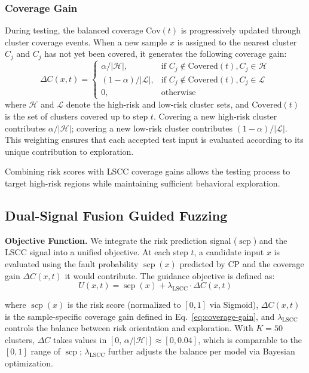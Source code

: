 \documentclass[preprint,number,5p,twocolumn]{elsarticle}
\DeclareMathOperator{\scp}{scp}
\begin{document}
\subsubsection{Coverage Gain}

During testing, the balanced coverage $\mathrm{Cov}(t)$ is progressively updated through cluster coverage events. When a new sample $x$ is assigned to the nearest cluster $C_j$ and $C_j$ has not yet been covered, it generates the following coverage gain:
\begin{equation}\label{eq:coverage-gain}
  \Delta C(x, t) =
  \begin{cases}
    \alpha / |\mathcal{H}|,       & \text{if } C_j \notin \mathrm{Covered}(t), C_j \in \mathcal{H} \\
    (1 - \alpha) / |\mathcal{L}|, & \text{if } C_j \notin \mathrm{Covered}(t), C_j \in \mathcal{L} \\
    0,                              & \text{otherwise}
  \end{cases}
\end{equation}
where $\mathcal{H}$ and $\mathcal{L}$ denote the high-risk and low-risk cluster sets, and $\mathrm{Covered}(t)$ is the set of clusters covered up to step $t$. Covering a new high-risk cluster contributes $\alpha / |\mathcal{H}|$; covering a new low-risk cluster contributes $(1 - \alpha) / |\mathcal{L}|$. This weighting ensures that each accepted test input is evaluated according to its unique contribution to exploration.

Combining risk scores with LSCC coverage gains allows the testing process to target high-risk regions while maintaining sufficient behavioral exploration.

\subsection{Dual-Signal Fusion Guided Fuzzing}\label{sec:fuzzing}

\textbf{Objective Function.} We integrate the risk prediction signal ($\scp$) and the LSCC signal into a unified objective. At each step $t$, a candidate input $x$ is evaluated using the fault probability $\scp(x)$ predicted by CP and the coverage gain $\Delta C(x, t)$ it would contribute. The guidance objective is defined as:
\begin{equation}\label{eq:objective}
  U(x, t) = \scp(x) + \lambda_{\mathrm{LSCC}} \cdot \Delta C(x, t)
\end{equation}

where $\scp(x)$ is the risk score (normalized to $[0,1]$ via Sigmoid),
$\Delta C(x, t)$ is the sample-specific coverage gain defined in Eq.~\ref{eq:coverage-gain},
and $\lambda_{\mathrm{LSCC}}$ controls the balance between risk orientation and exploration.
With $K{=}50$ clusters, $\Delta C$ takes values in $[0,\, \alpha/|\mathcal{H}|] \approx [0, 0.04]$, which is comparable to the $[0,1]$ range of $\scp$; $\lambda_{\mathrm{LSCC}}$ further adjusts the balance per model via Bayesian optimization.
\end{document}
